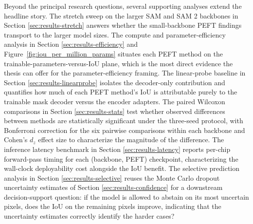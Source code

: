 \documentclass[11pt,a4paper,oneside]{report}
\begin{document}
Beyond the principal research questions, several supporting analyses extend the headline story. The stretch sweep on the larger SAM and SAM 2 backbones in Section \ref{sec:results-stretch} answers whether the small-backbone PEFT findings transport to the larger model sizes. The compute and parameter-efficiency analysis in Section \ref{sec:results-efficiency} and Figure~\ref{fig:iou_per_million_params} situates each PEFT method on the trainable-parameters-versus-IoU plane, which is the most direct evidence the thesis can offer for the parameter-efficiency framing. The linear-probe baseline in Section \ref{sec:results-linearprobe} isolates the decoder-only contribution and quantifies how much of each PEFT method's IoU is attributable purely to the trainable mask decoder versus the encoder adapters. The paired Wilcoxon comparisons in Section \ref{sec:results-stats} test whether observed differences between methods are statistically significant under the three-seed protocol, with Bonferroni correction for the six pairwise comparisons within each backbone and Cohen's $d_z$ effect size to characterize the magnitude of the difference. The inference latency benchmark in Section \ref{sec:results-latency} reports per-chip forward-pass timing for each (backbone, PEFT) checkpoint, characterizing the wall-clock deployability cost alongside the IoU benefit. The selective prediction analysis in Section \ref{sec:results-selective} reuses the Monte Carlo dropout uncertainty estimates of Section \ref{sec:results-confidence} for a downstream decision-support question: if the model is allowed to abstain on its most uncertain pixels, does the IoU on the remaining pixels improve, indicating that the uncertainty estimates correctly identify the harder cases?
\end{document}
